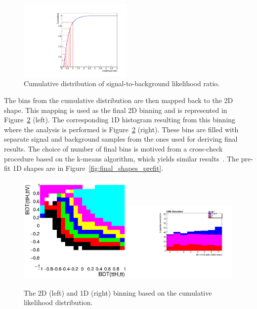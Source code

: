 \begin{figure}[htp]
\centering
\includegraphics[width=0.49\textwidth]{ch9_figs/cumulative_2lss.pdf}
\caption[Cumulative distribution of signal-to-background likelihood ratio]{Cumulative distribution of signal-to-background likelihood ratio.}
\label{fig:cum_dist}
\end{figure}

\noindent The bins from the cumulative distribution are then mapped back to the 2D shape. This mapping is used as the final 2D binning and is represented in Figure~\ref{fig:likelihood} (left).
The corresponding 1D histogram resulting from this binning where the analysis is performed is Figure~\ref{fig:likelihood} (right). These bins are filled with separate signal and background
samples from the ones used for deriving final results. The choice of number of final bins is motived from a cross-check procedure based on the k-means algorithm, which yields similar
results~\cite{CMS-AN-17-029}. The pre-fit 1D shapes are in Figure~\ref{fig:final_shapes_prefit}. 

\begin{figure}[htp]
\centering
\includegraphics[width=0.49\textwidth]{ch9_figs/likelihoodBased_2d_2lss.png}
\includegraphics[width=0.49\textwidth]{ch9_figs/likelihoodBased_1d_2lss.pdf}
\caption[The 2D and 1D binning based on the cumulative likelihood distribution]{The 2D (left) and 1D (right) binning based on the cumulative likelihood distribution.}
\label{fig:likelihood}
\end{figure}

